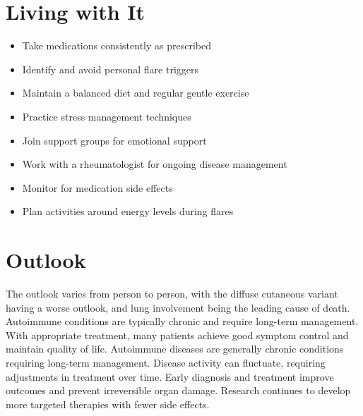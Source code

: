 \section{Living with It}
\begin{itemize}[noitemsep]
  \item Take medications consistently as prescribed
  \item Identify and avoid personal flare triggers
  \item Maintain a balanced diet and regular gentle exercise
  \item Practice stress management techniques
  \item Join support groups for emotional support
  \item Work with a rheumatologist for ongoing disease management
  \item Monitor for medication side effects
  \item Plan activities around energy levels during flares
\end{itemize}
\section{Outlook}
The outlook varies from person to person, with the diffuse cutaneous variant having a worse outlook, and lung involvement being the leading cause of death. Autoimmune conditions are typically chronic and require long-term management. With appropriate treatment, many patients achieve good symptom control and maintain quality of life. Autoimmune diseases are generally chronic conditions requiring long-term management. Disease activity can fluctuate, requiring adjustments in treatment over time. Early diagnosis and treatment improve outcomes and prevent irreversible organ damage. Research continues to develop more targeted therapies with fewer side effects.
